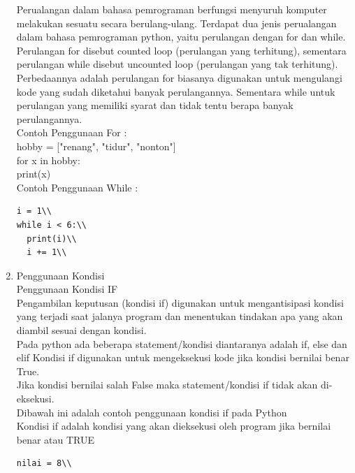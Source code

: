 \begin{enumerate}
Perualangan dalam bahasa pemrograman berfungsi menyuruh komputer melakukan sesuatu secara berulang-ulang. Terdapat dua jenis perualangan dalam bahasa pemrograman python, yaitu perulangan dengan for dan while.\\

Perulangan for disebut counted loop (perulangan yang terhitung), sementara perulangan while disebut uncounted loop (perulangan yang tak terhitung). Perbedaannya adalah perulangan for biasanya digunakan untuk mengulangi kode yang sudah diketahui banyak perulangannya. Sementara while untuk perulangan yang memiliki syarat dan tidak tentu berapa banyak perulangannya.\\

Contoh Penggunaan For :\\

hobby = ["renang", "tidur", "nonton"]\\
for x in hobby:\\
print(x)\\

Contoh Penggunaan While :\\
\begin{verbatim}
i = 1\\
while i < 6:\\
  print(i)\\
  i += 1\\
\end{verbatim}

\item Penggunaan Kondisi 
\\
Penggunaan Kondisi IF
\\
Pengambilan keputusan (kondisi if) digunakan untuk mengantisipasi kondisi yang terjadi saat jalanya program dan menentukan tindakan apa yang akan diambil sesuai dengan kondisi.
\\
Pada python ada beberapa statement/kondisi diantaranya adalah if, else dan elif Kondisi if digunakan untuk mengeksekusi kode jika kondisi bernilai benar True.
\\
Jika kondisi bernilai salah False maka statement/kondisi if tidak akan di-eksekusi.
\\
Dibawah ini adalah contoh penggunaan kondisi if pada Python
\\
Kondisi if adalah kondisi yang akan dieksekusi oleh program jika bernilai benar atau TRUE\\
\begin{verbatim}
nilai = 8\\


\end{verbatim}
\end{enumerate}
